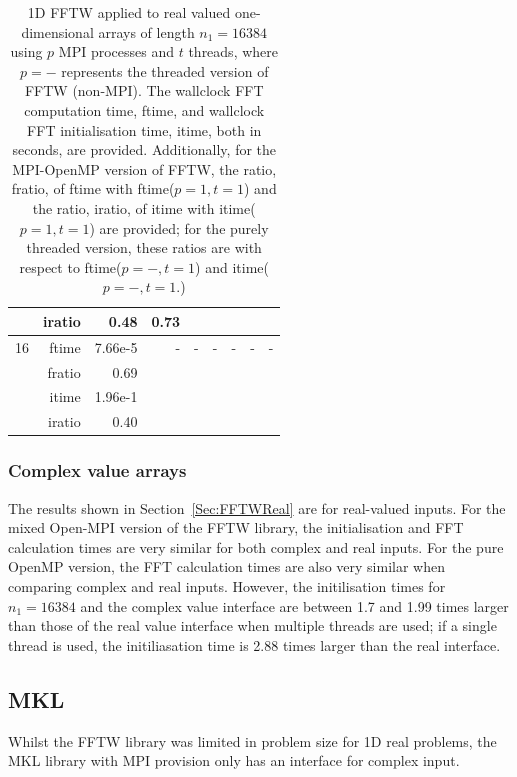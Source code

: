 \documentclass[a4]{article}
\begin{document}
\begin{table}
\begin{center}
\begin{tabular}{|r|r|r|r|r|r|r|r|r|}
      & iratio &  0.48 &   0.73  &  & & & & \\ \hline
    16 & ftime  &  7.66e-5   & - & - & - & - & - & - \\ 
     & fratio &    0.69  &  &  &  &  &  &  \\
      & itime &  1.96e-1   & & & & & & \\
      & iratio & 0.40   & & & & & & \\ \hline
\end{tabular}
\caption{1D FFTW applied to real valued one-dimensional arrays of length $n_1=16384$ using $p$ MPI processes and $t$ threads, where $p=-$ represents the threaded version of FFTW (non-MPI). The wallclock FFT computation time, ftime, and wallclock FFT initialisation time, itime, both in seconds, are provided. Additionally, for the MPI-OpenMP version of FFTW, the ratio, fratio, of ftime  with ftime($p=1,t=1$) and the ratio, iratio, of itime  with itime($p=1,t=1$) are provided; for the purely threaded version, these ratios are with respect to ftime($p=-,t=1$) and itime($p=-,t=1$.) }\label{Tbl:FFT1d16384}
\end{center}
\end{table}

\subsubsection{Complex value arrays}

The results shown in Section~\ref{Sec:FFTWReal} are for real-valued inputs. For 
the mixed Open-MPI version of the FFTW library, the initialisation and  FFT 
calculation times are very similar for both complex and real inputs. For the pure OpenMP version, the FFT calculation times are also very similar 
when comparing complex and real inputs. However, the initilisation times  for $n_1=16384$ and   the complex value interface are between 1.7 and 1.99 times larger than those of the real value interface when multiple threads are used; if a single thread is used, the initiliasation time is 2.88 times larger than the real interface. 



\subsection{MKL}
Whilst the FFTW library was limited in problem size for 1D real problems, the MKL library with MPI provision only has an interface for complex input.
\end{document}
